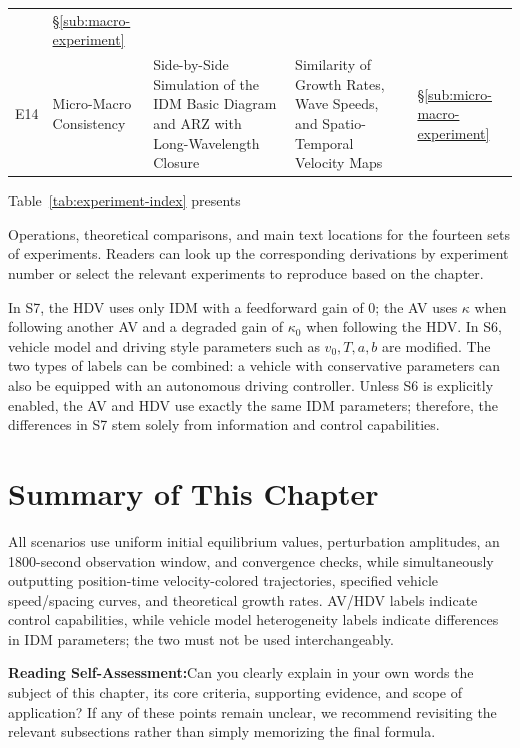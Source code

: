 \documentclass[11pt,a4paper,openany]{book}
\numberwithin{equation}{chapter}
\numberwithin{figure}{chapter}
\numberwithin{table}{chapter}
\newcommand{\tabletext}[2]{%
  \par\smallskip\noindent
  Table~\ref{#1} presents #2
\par\smallskip
}
\newcommand{\sectionwrapup}[1]{%
  \section{Summary of This Chapter}
  \begin{tcolorbox}[summarybox,title=\textbf{Chapter Review}]
  #1
  \par\smallskip
  \textbf{Reading Self-Assessment:}Can you clearly explain in your own words the subject of this chapter, its core criteria, supporting evidence, and scope of application? If any of these points remain unclear, we recommend revisiting the relevant subsections rather than simply memorizing the final formula.
\end{tcolorbox}
  \clearpage
}
\begin{document}
\begin{center}
\begin{tabular}{p{0.85cm}p{2.3cm}p{3.5cm}p{4.2cm}p{2.7cm}}
& \S\ref{sub:macro-experiment} \\
E14 &




 Micro-Macro Consistency




&




Side-by-Side Simulation of the IDM Basic Diagram and ARZ with Long-Wavelength Closure




&




Similarity of Growth Rates, Wave Speeds, and Spatio-Temporal Velocity Maps




& \S\ref{sub:micro-macro-experiment} \\
\bottomrule
\end{tabular}
\end{center}
\tabletext{tab:experiment-index}{




Operations, theoretical comparisons, and main text locations for the fourteen sets of experiments. Readers can look up the corresponding derivations by experiment number or select the relevant experiments to reproduce based on the chapter.
}

\begin{tcolorbox}[notebox,title=\textbf{AV, HDV, and vehicle model heterogeneity are two distinct sets of labels}]

In S7, the HDV uses only IDM with a feedforward gain of $0$; the AV uses $\kappa$ when following another AV and a degraded gain of $\kappa_0$ when following the HDV. In S6, vehicle model and driving style parameters such as $v_0,T,a,b$ are modified. The two types of labels can be combined: a vehicle with conservative parameters can also be equipped with an autonomous driving controller. Unless S6 is explicitly enabled, the AV and HDV use exactly the same IDM parameters; therefore, the differences in S7 stem solely from information and control capabilities.







\end{tcolorbox}

\sectionwrapup{All scenarios use uniform initial equilibrium values, perturbation amplitudes, an 1800-second observation window, and convergence checks, while simultaneously outputting position-time velocity-colored trajectories, specified vehicle speed/spacing curves, and theoretical growth rates. AV/HDV labels indicate control capabilities, while vehicle model heterogeneity labels indicate differences in IDM parameters; the two must not be used interchangeably.}
\end{document}
